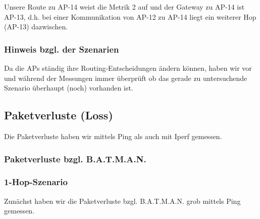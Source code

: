 \documentclass[a4paper,10pt]{article}
\begin{document}
Unsere Route zu AP-14 weist die Metrik 2 auf und der Gateway zu AP-14 ist AP-13, d.h. bei einer Kommunikation von AP-12 zu AP-14 liegt ein weiterer Hop (AP-13) dazwischen.

\subsubsection*{Hinweis bzgl. der Szenarien}

Da die APs ständig ihre Routing-Entscheidungen ändern können,
haben wir vor und während der Messungen immer überprüft ob das gerade zu untersuchende Szenario überhaupt (noch) vorhanden ist.

%
%
%
%
%
%
%
%
\subsection{Paketverluste (Loss)}

Die Paketverluste haben wir mittels Ping als auch mit Iperf gemessen.

\subsubsection{Paketverluste bzgl. B.A.T.M.A.N.}

\subsubsection*{1-Hop-Szenario}

Zunächst haben wir die Paketverluste bzgl. B.A.T.M.A.N. grob mittels Ping gemessen.
\end{document}
